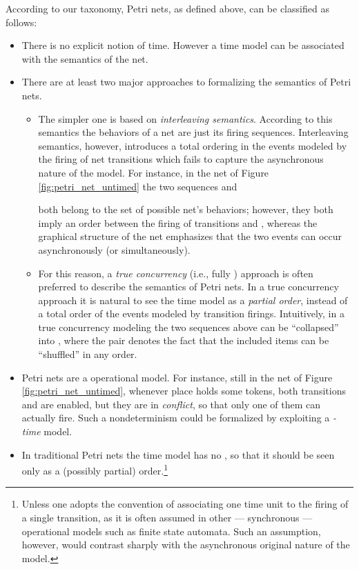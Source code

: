 According to our taxonomy, Petri nets, as defined above, can 
be classified as follows: 

\begin{itemize}
\item There is no explicit notion of time. However a time model can 
be  associated with the semantics of the net.

\item There are at least two major approaches to formalizing 
the semantics of Petri nets. 
  \begin{itemize}
  \item The simpler one is based on \emph{interleaving semantics}. According 
	 to this semantics the behaviors of a net are just its firing 
	 sequences. Interleaving semantics, however, introduces a total 
	 ordering in the events modeled by the firing of net transitions 
	 which fails to capture the asynchronous nature of the model. 
	 For instance, in the net of Figure \ref{fig:petri_net_untimed} the two sequences
	  and
	 
	 both belong to the set of possible net's behaviors; however, 
	 they both imply an order between the firing of transitions  and , 
	 whereas the graphical structure of the net emphasizes that the 
	 two events can occur asynchronously (or simultaneously).

  \item For this reason, a \emph{true concurrency} (i.e., fully ) 
	 approach is often preferred to describe the semantics of Petri 
	 nets. In a true concurrency approach it is natural to see the 
	 time model as a \emph{partial order}, instead of a total order of 
	 the events modeled by transition firings. Intuitively, in a true 
	 concurrency modeling the two sequences above can be ``collapsed'' into
	 ,
	 where the pair  denotes the fact that the included items can 
	 be ``shuffled'' in any order.
  \end{itemize}

\item Petri nets are a  operational model. For instance, 
still in the net of Figure \ref{fig:petri_net_untimed}, whenever place  holds 
some tokens, both transitions  and  are enabled, but they are 
in \emph{conflict}, so that only one of them can actually fire. 
Such a nondeterminism could be formalized by exploiting a \emph{-time} model.

\item In traditional Petri nets the time model has no , so that 
it should be seen only as a (possibly partial) order.\footnote{Unless one adopts the convention of associating one time unit to the firing of a single transition, as it is often assumed in other --- synchronous --- operational models such as finite state automata. Such an assumption, however, would contrast sharply with the asynchronous original nature of the model.}


\end{itemize}

